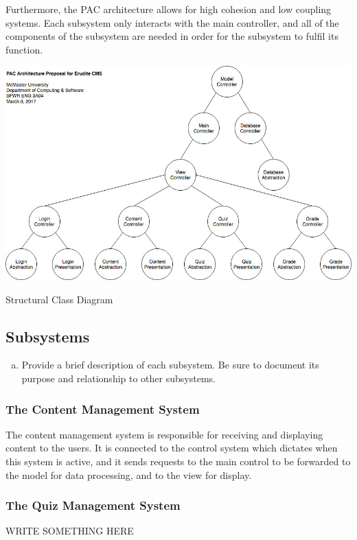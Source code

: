 \documentclass[]{article}
\begin{document}
Furthermore, the PAC architecture allows for high cohesion and low coupling systems. Each subsystem only interacts with the main controller, and all of the components of the subsystem are needed in order for the subsystem to fulfil its function. 


{
  \centering
    \includegraphics[scale=0.5]{A2_Assets/Structural_Class_Diagram_v2.jpg}
  \centerline{Structural Class Diagram}
}

\subsection{Subsystems}
\label{sub:subsystems}
\begin{enumerate}[a)]
	\item Provide a brief description of each subsystem. Be sure to document its 
purpose and relationship to other subsystems.
\end{enumerate}

\subsubsection{The Content Management System}
The content management system is responsible for receiving and displaying content to the users. It is connected to the control system which dictates when this system is active, and it sends requests to the main control to be forwarded to the model for data processing, and to the view for display.

\subsubsection{The Quiz Management System}
WRITE SOMETHING HERE
\end{document}
